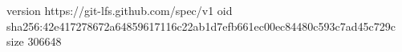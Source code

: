 version https://git-lfs.github.com/spec/v1
oid sha256:42e417278672a64859617116c22ab1d7efb661ec00ec84480c593c7ad45c729c
size 306648
